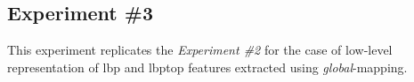 
\subsection{Experiment \#3}\label{subsec:exp3}
%
%
%
%

This experiment replicates the \emph{Experiment \#2} for the case of low-level representation of \ac{lbp} and \ac{lbptop} features extracted using \emph{global}-mapping.


